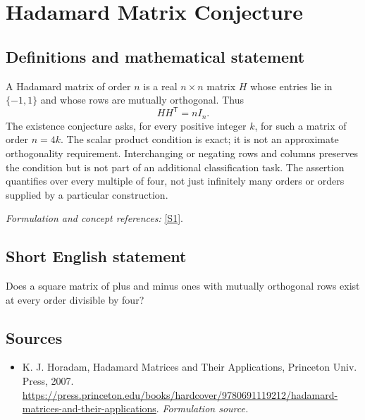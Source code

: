 \documentclass[11pt]{article}
\begin{document}
\section*{\texorpdfstring{Hadamard Matrix Conjecture}{Hadamard Matrix Conjecture}}\label{statement}
\subsection{Definitions and mathematical statement}
A Hadamard matrix of order $n$ is a real $n\times n$ matrix $H$ whose entries lie in $\{-1,1\}$ and whose rows are mutually orthogonal. Thus
\[
 HH^{\mathsf T}=nI_n.
\]
The existence conjecture asks, for every positive integer $k$, for such a matrix of order $n=4k$. The scalar product condition is exact; it is not an approximate orthogonality requirement. Interchanging or negating rows and columns preserves the condition but is not part of an additional classification task. The assertion quantifies over every multiple of four, not just infinitely many orders or orders supplied by a particular construction.
\par\smallskip\textit{Formulation and concept references:} \href{https://press.princeton.edu/books/hardcover/9780691119212/hadamard-matrices-and-their-applications}{[S1]}.

\subsection{Short English statement}
Does a square matrix of plus and minus ones with mutually orthogonal rows exist at every order divisible by four?
\subsection{Sources}
\begin{itemize}
\item[S1]K. J. Horadam, Hadamard Matrices and Their Applications, Princeton Univ. Press, 2007.
\url{https://press.princeton.edu/books/hardcover/9780691119212/hadamard-matrices-and-their-applications}.
\textit{Formulation source.}
\end{itemize}
\end{document}
